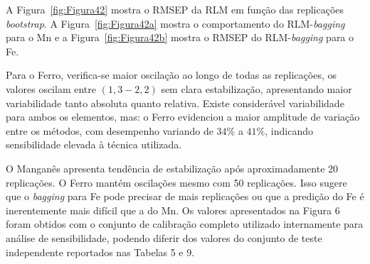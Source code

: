 A Figura~\ref{fig:Figura42} mostra o RMSEP da RLM em função das replicações \textit{bootstrap}. A Figura~\ref{fig:Figura42a} mostra o comportamento do RLM-\textit{bagging} para o Mn e a Figura~\ref{fig:Figura42b} mostra o RMSEP do RLM-\textit{bagging} para o Fe.

Para o Ferro, verifica-se maior oscilação ao longo de todas as replicações, os valores oscilam entre $(1,3-2,2)$ sem clara estabilização, apresentando maior variabilidade tanto absoluta quanto relativa. Existe considerável variabilidade para ambos os elementos, mas: o Ferro evidenciou a maior amplitude de variação entre os métodos, com desempenho variando de $34\%$ a $41\%$, indicando sensibilidade elevada à técnica utilizada.

O Manganês apresenta tendência de estabilização após aproximadamente 20 replicações. O Ferro mantém oscilações mesmo com 50 replicações. Isso sugere que o \textit{bagging} para Fe pode precisar de mais replicações ou que a predição do Fe é inerentemente mais difícil que a do Mn. Os valores apresentados na Figura 6 foram obtidos com o conjunto de calibração completo utilizado internamente para análise de sensibilidade, podendo diferir dos valores do conjunto de teste independente reportados nas Tabelas 5 e 9.

